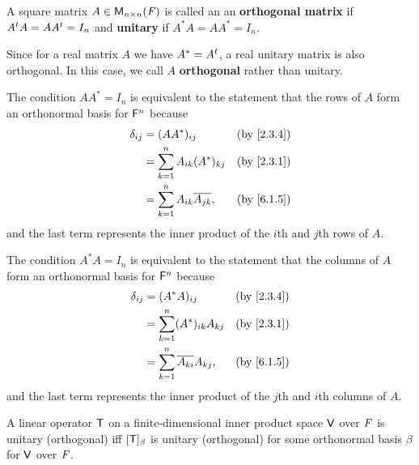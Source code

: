 \begin{defn}\label{6.5.9}
  A square matrix \(A \in \ms[n][n][\F]\) is called an an \textbf{orthogonal matrix} if \({A}^{t} A = A {A}^{t} = I_n\) and \textbf{unitary} if \(A^* A = A A^* = I_n\).

  Since for a real matrix \(A\) we have \(A^* = {A}^{t}\), a real unitary matrix is also orthogonal.
  In this case, we call \(A\) \textbf{orthogonal} rather than unitary.

  The condition \(A A^* = I_n\) is equivalent to the statement that the rows of \(A\) form an orthonormal basis for \(\mathsf{F}^n\) because
  \begin{align*}
    \delta_{i j} & = (A A^*)_{i j}                          &  & \by{2.3.4} \\
                 & = \sum_{k = 1}^n A_{i k} (A^*)_{k j}     &  & \by{2.3.1} \\
                 & = \sum_{k = 1}^n A_{i k} \conj{A_{j k}}, &  & \by{6.1.5}
  \end{align*}
  and the last term represents the inner product of the \(i\)th and \(j\)th rows of \(A\).

  The condition \(A^* A = I_n\) is equivalent to the statement that the columns of \(A\) form an orthonormal basis for \(\mathsf{F}^n\) because
  \begin{align*}
    \delta_{i j} & = (A^* A)_{i j}                          &  & \by{2.3.4} \\
                 & = \sum_{k = 1}^n (A^*)_{i k} A_{k j}     &  & \by{2.3.1} \\
                 & = \sum_{k = 1}^n \conj{A_{k i}} A_{k j}, &  & \by{6.1.5}
  \end{align*}
  and the last term represents the inner product of the \(j\)th and \(i\)th columns of \(A\).
\end{defn}

\begin{cor}\label{6.5.10}
  A linear operator \(\mathsf{T}\) on a finite-dimensional inner product space \(\mathsf{V}\) over \(\mathit{F}\) is unitary (orthogonal) iff \([\mathsf{T}]_{\beta}\) is unitary (orthogonal) for some orthonormal basis \(\beta\) for \(\mathsf{V}\) over \(\mathit{F}\).
\end{cor}

